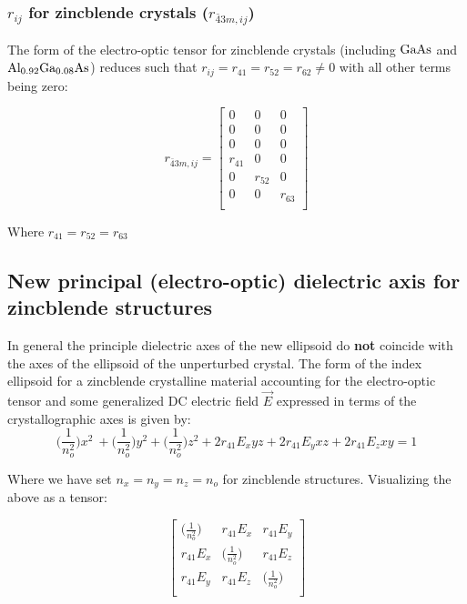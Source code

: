
\subsubsection{\texorpdfstring{$r_{ij}$}{rij} for zincblende crystals (\texorpdfstring{$r_{\bar{4}3m, ij}$}{r43})}

The form of the electro-optic tensor for zincblende crystals (including $\mathrm{GaAs}$ and $\mathrm{Al_{0.92}Ga_{0.08}As}$) reduces such that $r_{ij} = r_{41} = r_{52} = r_{62} \neq 0$ with all other terms being zero:

\begin{equation}
r_{\bar{4}3m,ij} =
 \left[ {\begin{array}{ccc}
  0 & 0 & 0\\
  0 & 0 & 0\\
  0 & 0 & 0\\
  r_{41} & 0 & 0\\
  0 & r_{52} & 0\\
  0 & 0 & r_{63}\\
 \end{array}} \right]
\end{equation}

\noindent Where $r_{41} = r_{52} = r_{63}$

\subsection{New principal (electro-optic) dielectric axis for zincblende structures}
In general the principle dielectric axes of the new ellipsoid do \textbf{not} coincide with the axes of the ellipsoid of the unperturbed crystal. The form of the index ellipsoid for a zincblende crystalline material accounting for the electro-optic tensor and some generalized DC electric field $\vec{E}$ expressed in terms of the crystallographic axes is given by:
\begin{equation}\label{eq:zindicatrix}
\bigg(\frac{1}{n_o^2} \bigg) x^2\ + \bigg(\frac{1}{n_o^2} \bigg) y^2 + \bigg(\frac{1}{n_o^2} \bigg) z^2  + 2r_{41} E_{x} yz + 2r_{41} E_{y} xz + 2r_{41}E_{z} xy= 1
\end{equation}

\noindent Where we have set $n_x = n_y = n_z = n_o$ for zincblende structures. Visualizing the above as a tensor:

\begin{equation}
\left[ {\begin{array}{ccc}
   \big( \frac{1}{n_o ^2} \big)& r_{41}E_{x} & r_{41} E_{y}\\
   r_{41}E_{x} & \big( \frac{1}{n_o ^2} \big) & r_{41} E_{z}\\
   r_{41} E_{y} & r_{41} E_{z} & \big( \frac{1}{n_o ^2} \big)\\
\end{array}} \right]
\end{equation}



